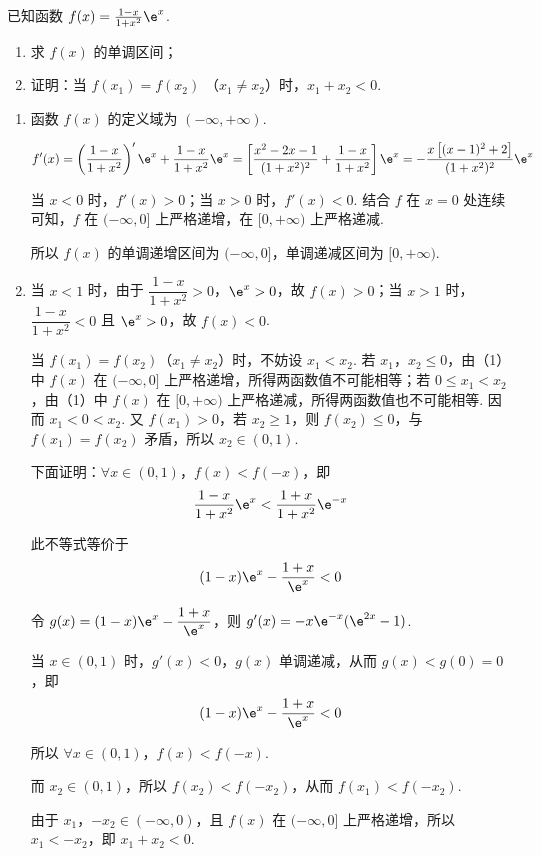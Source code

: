 \begin{problem}
已知函数 \( f(x) = \frac{1 - x}{1 + x^{2}} \e^x \).
\begin{enumerate}
\item 求 \( f(x) \) 的单调区间；
\item 证明：当 \( f(x_{1}) = f(x_{2})  \) （\(x_{1} \neq x_{2}\)）时，\( x_{1} + x_{2} < 0 \).
\end{enumerate}
\end{problem}

\begin{solution}
\begin{enumerate}
\item 函数 \(f(x)\) 的定义域为 \((-\infty,+\infty)\).

\[
f'(x)=\left(\frac{1-x}{1+x^{2}}\right)'\e^x+\frac{1-x}{1+x^{2}}\e^x=\left[\frac{x^{2}-2x-1}{(1+x^{2})^{2}}+\frac{1-x}{1+x^{2}}\right]\e^x=-\frac{x\left[(x-1)^{2}+2\right]}{(1+x^{2})^{2}}\e^x
\]

当 \(x<0\) 时，\(f'(x)>0\)；当 \(x>0\) 时，\(f'(x)<0\). 结合 \(f\) 在 \(x=0\) 处连续可知，\(f\) 在 \((-\infty,0]\) 上严格递增，在 \([0,+\infty)\) 上严格递减.

所以 \(f(x)\) 的单调递增区间为 \((-\infty,0]\)，单调递减区间为 \([0,+\infty)\).

\item 当 \(x<1\) 时，由于 \(\dfrac{1-x}{1+x^{2}}>0\)，\(\e^x>0\)，故 \(f(x)>0\)；当 \(x>1\) 时，\(\dfrac{1-x}{1+x^{2}}<0\) 且 \(\e^x>0\)，故 \(f(x)<0\).

当 \(f(x_{1})=f(x_{2})\)（\(x_{1}\neq x_{2}\)）时，不妨设 \(x_{1}<x_{2}\). 若 \(x_{1}\)，\(x_{2}\leqslant0\)，由（1）中 \(f(x)\) 在 \((-\infty,0]\) 上严格递增，所得两函数值不可能相等；若 \(0\leqslant x_{1}<x_{2}\)，由（1）中 \(f(x)\) 在 \([0,+\infty)\) 上严格递减，所得两函数值也不可能相等. 因而 \(x_{1}<0<x_{2}\). 又 \(f(x_{1})>0\)，若 \(x_{2}\geqslant1\)，则 \(f(x_{2})\leqslant0\)，与 \(f(x_{1})=f(x_{2})\) 矛盾，所以 \(x_{2}\in(0,1)\).

下面证明：\(\forall x\in(0,1)\)，\(f(x)<f(-x)\)，即
\[
\frac{1-x}{1+x^{2}}\e^x<\frac{1+x}{1+x^{2}}\e^{-x}
\]

此不等式等价于
\[
(1-x)\e^x-\frac{1+x}{\e^x}<0
\]

令 \(g(x)=(1-x)\e^x-\dfrac{1+x}{\e^x}\)，则 \(g'(x)=-x\e^{-x}(\e^{2x}-1)\).

当 \(x\in(0,1)\) 时，\(g'(x)<0\)，\(g(x)\) 单调递减，从而 \(g(x)<g(0)=0\)，即
\[
(1-x)\e^x-\frac{1+x}{\e^x}<0
\]

所以 \(\forall x\in(0,1)\)，\(f(x)<f(-x)\).

而 \(x_{2}\in(0,1)\)，所以 \(f(x_{2})<f(-x_{2})\)，从而 \(f(x_{1})<f(-x_{2})\).

由于 \(x_{1}\)，\(-x_{2}\in(-\infty,0)\)，且 \(f(x)\) 在 \((-\infty,0]\) 上严格递增，所以 \(x_{1}<-x_{2}\)，即 \(x_{1}+x_{2}<0\).
\end{enumerate}
\end{solution}

